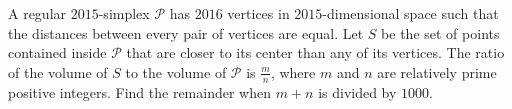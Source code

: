 A regular $2015$-simplex $\mathcal P$ has $2016$ vertices in $2015$-dimensional space such that the distances between every pair of vertices are equal. Let $S$ be the set of points contained inside $\mathcal P$ that are closer to its center than any of its vertices. The ratio of the volume of $S$ to the volume of  $\mathcal P$ is $\frac mn$, where $m$ and $n$ are relatively prime positive integers. Find the remainder when $m+n$ is divided by $1000$.
